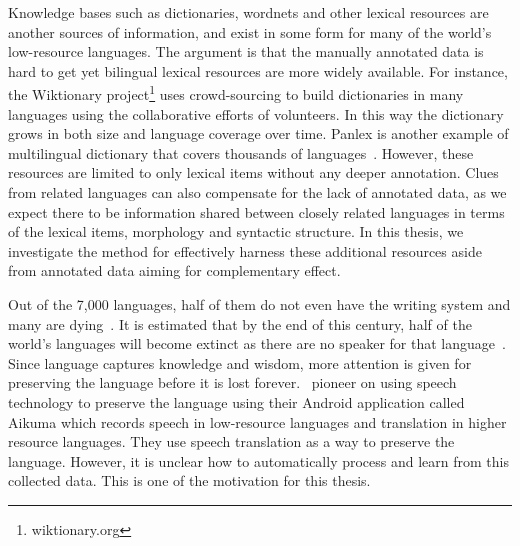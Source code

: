 \documentclass[12pt,twoside,final,hidelinks]{ltthesis}
\theoremstyle{definition}
\begin{document}
Knowledge bases such as dictionaries, wordnets and 
other lexical resources are another sources of information, and exist in some form for many of the world's low-resource languages. The argument is that the 
manually annotated data is hard to get yet bilingual lexical resources are more widely available. For instance, the Wiktionary 
project\footnote{wiktionary.org} uses crowd-sourcing to build dictionaries in many languages using the collaborative efforts of volunteers. In this way the 
dictionary grows in both size and language coverage over time. Panlex is another example of multilingual dictionary that covers thousands of 
languages~\cite{Kamholz14}. However, these resources are limited to only lexical items without any deeper annotation. Clues from related languages can also compensate for the lack of 
annotated data, as we expect there to be information shared between closely related languages in terms of the lexical items, morphology and syntactic structure. In 
this thesis, we investigate the method for effectively harness these additional resources aside from annotated data aiming for complementary effect. 

% 
Out of the 7,000 languages, half of them do not even have the writing system and many are dying~\cite{lewis2009}. It is estimated that by the end of this century, 
half of the world's languages will become extinct as there are no speaker for that language~\cite{crystal2002language}. Since language captures knowledge and 
wisdom, more attention is given for preserving the language before it is lost forever.~ pioneer on using speech technology to 
preserve the language using their Android application called Aikuma which records speech in low-resource languages and translation in higher 
resource languages. They use speech translation as a way to preserve the language. However, it is unclear how to automatically process and learn from this collected 
data. This is one of the motivation for this thesis. 
\end{document}
